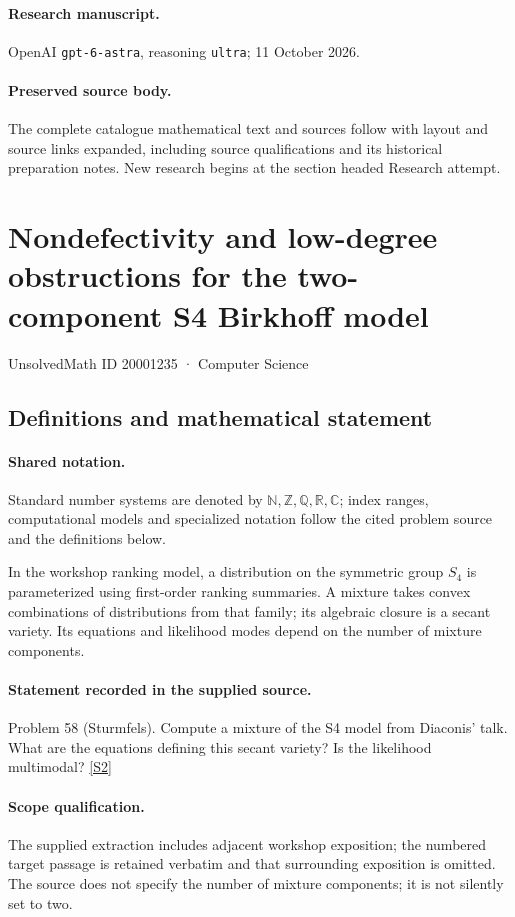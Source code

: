 \documentclass[11pt]{article}
\begin{document}
\paragraph{Research manuscript.} OpenAI \texttt{gpt-6-astra}, reasoning \texttt{ultra}; 11 October 2026.
\paragraph{Preserved source body.} The complete catalogue mathematical text and sources follow with layout and source links expanded, including source qualifications and its historical preparation notes. New research begins at the section headed Research attempt.

\section{Nondefectivity and low-degree obstructions for the two-component S4 Birkhoff model}\label{20001235}
{\small UnsolvedMath ID 20001235 · Computer Science}
\subsection{Definitions and mathematical statement}

\paragraph{Shared notation.}Standard number systems are denoted by $\mathbb N,\mathbb Z,\mathbb Q,\mathbb R,\mathbb C$; index ranges, computational models and specialized notation follow the cited problem source and the definitions below.


In the workshop ranking model, a distribution on the symmetric group $S_4$ is parameterized using first-order ranking summaries. A mixture takes convex combinations of distributions from that family; its algebraic closure is a secant variety. Its equations and likelihood modes depend on the number of mixture components.
\paragraph{Statement recorded in the supplied source.}
Problem 58 (Sturmfels). Compute a mixture of the S4 model from Diaconis' talk. What are the equations defining this secant variety? Is the likelihood multimodal? \href{https://aimath.org/WWN/compalgstat/compalgstat.pdf}{[S2]}
\paragraph{Scope qualification.}
The supplied extraction includes adjacent workshop exposition; the numbered target passage is retained verbatim and that surrounding exposition is omitted. The source does not specify the number of mixture components; it is not silently set to two.
\end{document}
